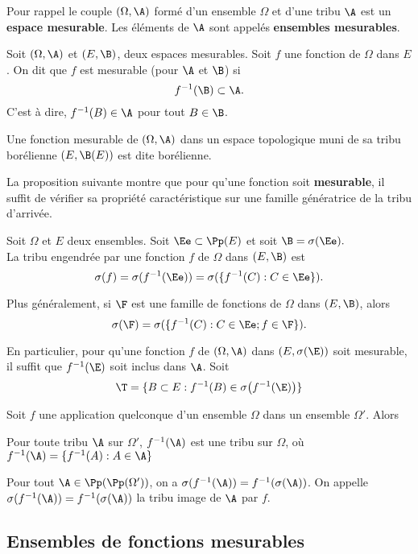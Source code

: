 \bigskip

 Pour rappel le couple $(\Omega, \A)$ formé d'un ensemble $\Omega$ et d'une tribu $\A$ est un \textbf{espace mesurable}. Les éléments de $\A$ sont appelés \textbf{ensembles mesurables}.
\ben
    \item[(i)] Soit $(\Omega, \A)$ et $(E, \B)$, deux espaces mesurables. Soit $f$ une fonction de $\Omega$ dans $E$. On dit que $f$ est mesurable (pour $\A$ et $\B$) si $$f^{-1}(\B) \subset \A.$$ C'est à dire, $f^{-1}(B) \in \A$ pour tout $B \in \B$.
\een
\ed

\bigskip

Une fonction mesurable de $(\Omega, \A)$ dans un espace topologique muni de sa tribu borélienne $(E, \B(E))$ est dite borélienne.
\ed
    
\bigskip

La proposition suivante montre que pour qu'une fonction soit \textbf{mesurable}, il suffit de vérifier sa propriété caractéristique sur une famille génératrice de la tribu d'arrivée.

 Soit $\Omega$ et $E$ deux ensembles. Soit $\Ee \subset \Pp(E)$ et soit $\B = \sigma(\Ee).$\\
La tribu engendrée par une fonction $f$ de $\Omega$ dans $(E, \B)$ est $$\sigma(f) = \sigma(f^{-1}(\Ee)) = \sigma(\{f^{-1}(C) : C \in \Ee\}).$$

Plus généralement, si $\F$ est une famille de fonctions de $\Omega$ dans $(E, \B)$, alors $$\sigma(\F) = \sigma(\{f^{-1}(C) : C \in \Ee ; f \in \F\}).$$

En particulier, pour qu'une fonction $f$ de $(\Omega, \A)$ dans $(E, \sigma(\E))$ soit mesurable, il suffit que $f^{-1}(\E)$ soit inclus dans $\A$.
\ep
 \bpf
 Soit $$\T = \{B \subset E : f^{-1}(B) \in \sigma\big(f^{-1}(\E)\big)\}$$
 \epf
    
Soit $f$ une application quelconque d'un ensemble $\Omega$ dans un ensemble $\Omega'$. Alors
\ben
    \item Pour toute tribu $\A$ sur $\Omega'$, $f^{-1}(\A)$ est une tribu sur $\Omega$, où $f^{-1}(\A) = \{f^{-1}(A) : A \in \A\}$
    \item Pour tout $\A \in \Pp(\Pp(\Omega'))$, on a $\sigma(f^{-1}(\A)) = f^{-1}(\sigma(\A))$.
\een
    On appelle $\sigma(f^{-1}(\A)) = f^{-1}(\sigma(\A))$ la tribu image de $\A$ par $f$.

\ep
\subsection{Ensembles de fonctions mesurables}

